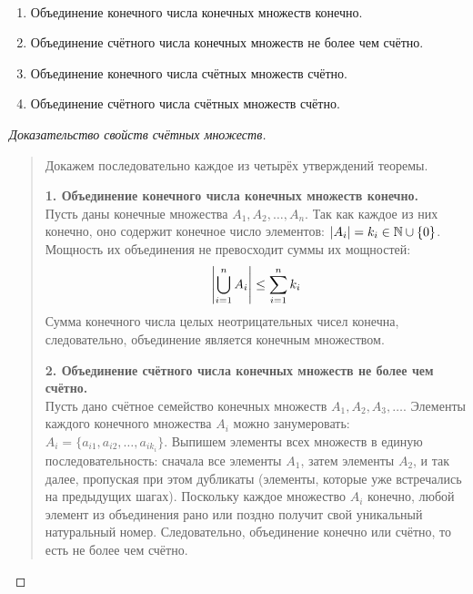 \begin{theorem} ~
    \begin{enumerate}
        \item Объединение конечного числа конечных множеств конечно.
        \item Объединение счётного числа конечных множеств не более чем 
        счётно.
        \item Объединение конечного числа счётных множеств счётно.
        \item Объединение счётного числа счётных множеств счётно.
    \end{enumerate}
\end{theorem}

\begin{proof}[Доказательство свойств счётных множеств]~\\
    \begin{quote}
        Докажем последовательно каждое из четырёх утверждений теоремы.

        \textbf{1. Объединение конечного числа конечных множеств конечно.}\\
        Пусть даны конечные множества $A_1, A_2, \dots, A_n$. Так как 
        каждое из них конечно, оно содержит конечное число элементов: 
        $\left| A_i \right| = k_i \in \mathbb{N} \cup \{0\}$. Мощность их объединения не 
        превосходит суммы их мощностей:
        \[
            \left| \bigcup_{i=1}^n A_i \right| \le \sum_{i=1}^n k_i
        \]
        Сумма конечного числа целых неотрицательных чисел конечна, 
        следовательно, объединение является конечным множеством.

        \textbf{2. Объединение счётного числа конечных множеств не более 
        чем счётно.}\\
        Пусть дано счётное семейство конечных множеств $A_1, A_2, A_3, \dots$. 
        Элементы каждого конечного множества $A_i$ можно занумеровать: 
        $A_i = \{a_{i1}, a_{i2}, \dots, a_{i k_i}\}$. Выпишем элементы всех 
        множеств в единую последовательность: сначала все элементы $A_1$, 
        затем элементы $A_2$, и так далее, пропуская при этом дубликаты 
        (элементы, которые уже встречались на предыдущих шагах). Поскольку 
        каждое множество $A_i$ конечно, любой элемент из объединения рано 
        или поздно получит свой уникальный натуральный номер. Следовательно, 
        объединение конечно или счётно, то есть не более чем счётно.


\end{quote}
\end{proof}
